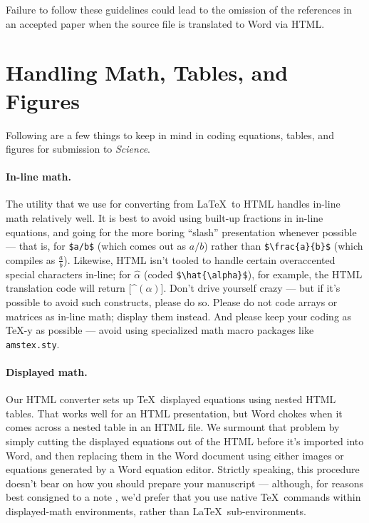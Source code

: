 \documentclass[10pt]{article}
\begin{document}
\noindent Failure to follow these guidelines could lead
to the omission of the references in an accepted paper when the source
file is translated to Word via HTML.

\section*{Handling Math, Tables, and Figures}

Following are a few things to keep in mind in coding equations,
tables, and figures for submission to {\it Science}.

\paragraph*{In-line math.}  The utility that we use for converting
from \LaTeX\ to HTML handles in-line math relatively well.  It is best
to avoid using built-up fractions in in-line equations, and going for
the more boring ``slash'' presentation whenever possible --- that is,
for \verb+$a/b$+ (which comes out as $a/b$) rather than
\verb+$\frac{a}{b}$+ (which compiles as $\frac{a}{b}$).  Likewise,
HTML isn't tooled to handle certain overaccented special characters
in-line; for $\hat{\alpha}$ (coded \verb+$\hat{\alpha}$+), for
example, the HTML translation code will return [\^{}$(\alpha)$].
Don't drive yourself crazy --- but if it's possible to avoid such
constructs, please do so.  Please do not code arrays or matrices as
in-line math; display them instead.  And please keep your coding as
\TeX-y as possible --- avoid using specialized math macro packages
like \texttt{amstex.sty}.

\paragraph*{Displayed math.} Our HTML converter sets up \TeX\
displayed equations using nested HTML tables.  That works well for an
HTML presentation, but Word chokes when it comes across a nested
table in an HTML file.  We surmount that problem by simply cutting the
displayed equations out of the HTML before it's imported into Word,
and then replacing them in the Word document using either images or
equations generated by a Word equation editor.  Strictly speaking,
this procedure doesn't bear on how you should prepare your manuscript
--- although, for reasons best consigned to a note \cite{nattex}, we'd
prefer that you use native \TeX\ commands within displayed-math
environments, rather than \LaTeX\ sub-environments.
\end{document}

